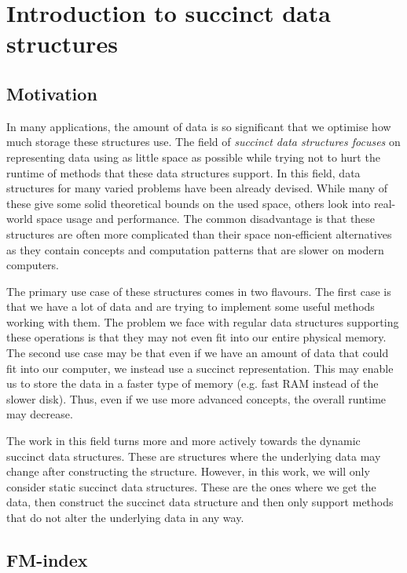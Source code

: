 \chapter{Introduction to succinct data structures}
\label{kap:kap1}

\section{Motivation}

In many applications, the amount of data is so significant that we optimise how much
storage these structures use. The field of \textit{succinct data structures focuses}
on representing data using as little space as possible while trying not to hurt the
runtime of methods that these data structures support. In this field, data structures
for many varied problems have been already devised. While many of these give some solid
theoretical bounds on the used space, others look into real-world space usage and
performance. The common disadvantage is that these structures are often more complicated
than their space non-efficient alternatives as they contain concepts and computation
patterns that are slower on modern computers.

The primary use case of these structures comes in two flavours. The first case is
that we have a lot of data and are trying to implement some useful methods working
with them. The problem we face with regular data structures supporting these
operations is that they may not even fit into our entire physical memory. The
second use case may be that even if we have an amount of data that could fit
into our computer, we instead use a succinct representation. This may enable us
to store the data in a faster type of memory (e.g. fast RAM instead of the
slower disk). Thus, even if we use more advanced concepts, the overall runtime
may decrease.

The work in this field turns more and more actively towards the dynamic succinct
data structures. These are structures where the underlying data may change after
constructing the structure. However, in this work, we will only consider static
succinct data structures. These are the ones where we get the data, then construct
the succinct data structure and then only support methods that do not alter the
underlying data in any way.

\section{FM-index}

